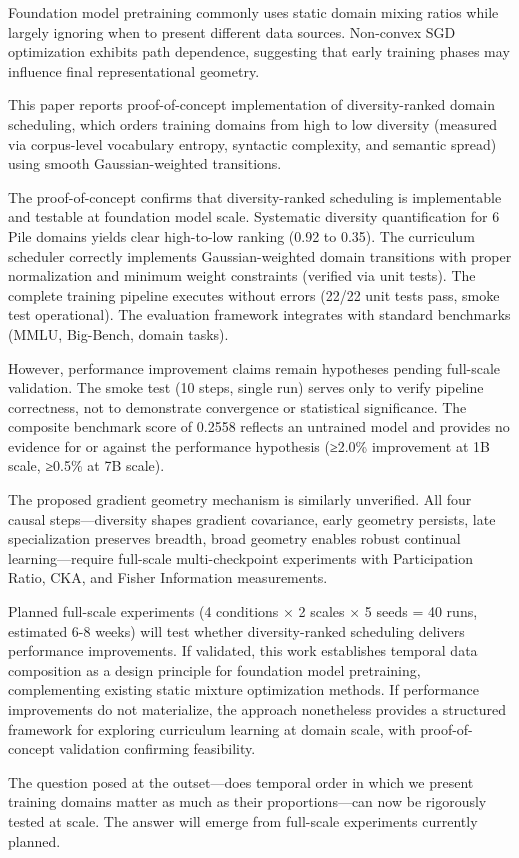 
Foundation model pretraining commonly uses static domain mixing ratios while largely ignoring when to present different data sources. Non-convex SGD optimization exhibits path dependence, suggesting that early training phases may influence final representational geometry.

This paper reports proof-of-concept implementation of diversity-ranked domain scheduling, which orders training domains from high to low diversity (measured via corpus-level vocabulary entropy, syntactic complexity, and semantic spread) using smooth Gaussian-weighted transitions.

The proof-of-concept confirms that diversity-ranked scheduling is implementable and testable at foundation model scale. Systematic diversity quantification for 6 Pile domains yields clear high-to-low ranking (0.92 to 0.35). The curriculum scheduler correctly implements Gaussian-weighted domain transitions with proper normalization and minimum weight constraints (verified via unit tests). The complete training pipeline executes without errors (22/22 unit tests pass, smoke test operational). The evaluation framework integrates with standard benchmarks (MMLU, Big-Bench, domain tasks).

However, performance improvement claims remain hypotheses pending full-scale validation. The smoke test (10 steps, single run) serves only to verify pipeline correctness, not to demonstrate convergence or statistical significance. The composite benchmark score of 0.2558 reflects an untrained model and provides no evidence for or against the performance hypothesis (≥2.0\% improvement at 1B scale, ≥0.5\% at 7B scale).

The proposed gradient geometry mechanism is similarly unverified. All four causal steps—diversity shapes gradient covariance, early geometry persists, late specialization preserves breadth, broad geometry enables robust continual learning—require full-scale multi-checkpoint experiments with Participation Ratio, CKA, and Fisher Information measurements.

Planned full-scale experiments (4 conditions × 2 scales × 5 seeds = 40 runs, estimated 6-8 weeks) will test whether diversity-ranked scheduling delivers performance improvements. If validated, this work establishes temporal data composition as a design principle for foundation model pretraining, complementing existing static mixture optimization methods. If performance improvements do not materialize, the approach nonetheless provides a structured framework for exploring curriculum learning at domain scale, with proof-of-concept validation confirming feasibility.

The question posed at the outset—does temporal order in which we present training domains matter as much as their proportions—can now be rigorously tested at scale. The answer will emerge from full-scale experiments currently planned.
